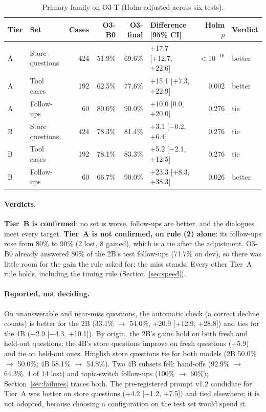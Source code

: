 \documentclass[11pt,a4paper]{article}
\begin{document}
\begin{table}[H]
\centering\small
\caption{Primary family on O3-T (Holm-adjusted across six tests).}\label{tab:step14}
\begin{tabular}{llrrrlrl}
\toprule
Tier & Set & Cases & O3-B0 & O3-final & Difference [95\% CI] & Holm $p$ & Verdict \\
\midrule
A & Store questions & 424 & 51.9\% & 69.6\% & +17.7 [+12.7, +22.6] & $<10^{-10}$ & better \\
A & Tool cases & 192 & 62.5\% & 77.6\% & +15.1 [+7.3, +22.9] & 0.002 & better \\
A & Follow-ups & 60 & 80.0\% & 90.0\% & +10.0 [0.0, +20.0] & 0.276 & tie \\
B & Store questions & 424 & 78.3\% & 81.4\% & +3.1 [$-$0.2, +6.4] & 0.276 & tie \\
B & Tool cases & 192 & 78.1\% & 83.3\% & +5.2 [$-$2.1, +12.5] & 0.276 & tie \\
B & Follow-ups & 60 & 66.7\% & 90.0\% & +23.3 [+8.3, +38.3] & 0.026 & better \\
\bottomrule
\end{tabular}
\end{table}

\paragraph{Verdicts.} \textbf{Tier~B is confirmed}: no set is worse, follow-ups are better, and the dialogues meet every
target. \textbf{Tier~A is not confirmed, on rule (2) alone}: its follow-ups rose from 80\% to 90\% (2 lost, 8 gained),
which is a tie after the adjustment. O3-B0 already answered 80\% of the 2B's test follow-ups (71.7\% on dev), so there
was little room for the gain the rule asked for; the miss stands. Every other Tier~A rule holds, including the timing
rule (Section~\ref{sec:speed}).

\paragraph{Reported, not deciding.} On unanswerable and near-miss questions, the automatic check (a correct decline
counts) is better for the 2B (33.1\% $\to$ 54.0\%, +20.9 [+12.9, +28.8]) and ties for the 4B (+2.9 [$-$4.3, +10.1]). By
origin, the 2B's gains hold on both fresh and held-out questions; the 4B's store questions improve on fresh questions
(+5.9) and tie on held-out ones. Hinglish store questions tie for both models (2B 50.0\% $\to$ 50.0\%; 4B 58.1\% $\to$
54.8\%). Two 4B subsets fell: hand-offs (92.9\% $\to$ 64.3\%, 4 of 14 lost) and topic-switch follow-ups (100\% $\to$
60\%); Section~\ref{sec:failures} traces both. The pre-registered prompt v1.2 candidate for Tier~A was better on store
questions (+4.2 [+1.2, +7.5]) and tied elsewhere; it is not adopted, because choosing a configuration on the test set
would spend it.
\end{document}
